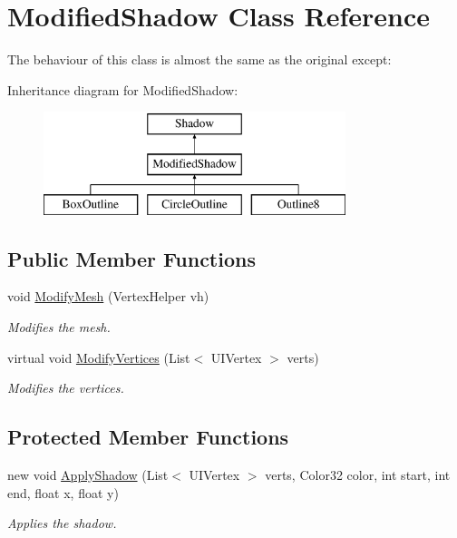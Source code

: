 \hypertarget{class_modified_shadow}{}\section{Modified\+Shadow Class Reference}
\label{class_modified_shadow}


The behaviour of this class is almost the same as the original except\+:  


Inheritance diagram for Modified\+Shadow\+:\begin{figure}[H]
\begin{center}
\leavevmode
\includegraphics[height=3.000000cm]{class_modified_shadow}
\end{center}
\end{figure}
\subsection*{Public Member Functions}
\begin{DoxyCompactItemize}
\item 
void \hyperlink{class_modified_shadow_a89b5a823f795cc3c2f94cfb06d8a995d}{Modify\+Mesh} (Vertex\+Helper vh)
\begin{DoxyCompactList}\small\item\em Modifies the mesh. \end{DoxyCompactList}\item 
virtual void \hyperlink{class_modified_shadow_ac1651effd229c1fd2f454eccc2cf225c}{Modify\+Vertices} (List$<$ U\+I\+Vertex $>$ verts)
\begin{DoxyCompactList}\small\item\em Modifies the vertices. \end{DoxyCompactList}\end{DoxyCompactItemize}
\subsection*{Protected Member Functions}
\begin{DoxyCompactItemize}
\item 
new void \hyperlink{class_modified_shadow_a3dd596a0cb967c4a45f107938194e46a}{Apply\+Shadow} (List$<$ U\+I\+Vertex $>$ verts, Color32 color, int start, int end, float x, float y)
\begin{DoxyCompactList}\small\item\em Applies the shadow. \end{DoxyCompactList}\end{DoxyCompactItemize}


